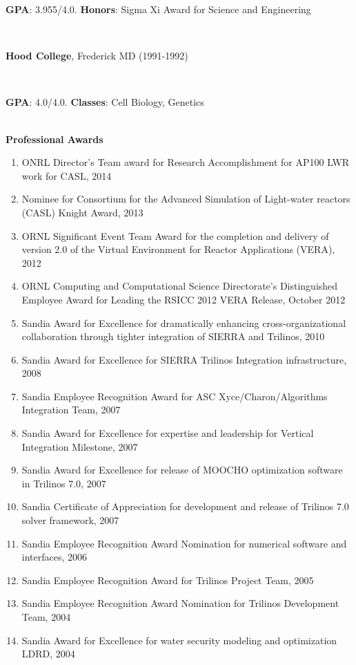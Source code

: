 \documentclass{report}
\newcommand{\secendvs}{1.5ex}
\newcommand{\indentone}{0.5in}
\newcommand{\widthone}{6.4in}
\newcommand{\pboxone}{\hspace*{\indentone}\parbox[t]{\widthone}}
\newcommand{\indenttwo}{0.75in}
\newcommand{\widthtwo}{6.15in}
\newcommand{\pboxtwo}{\hspace*{\indenttwo}\parbox[t]{\widthtwo}}
\begin{document}
%
{}\pboxtwo{\textbf{GPA}: 3.955/4.0.  {}\textbf{Honors}: Sigma Xi Award for Science and Engineering} \\[\secendvs]
%
{}\pboxone{\textbf{Hood College}, Frederick MD (1991-1992)} \\
%
{}\pboxtwo{\textbf{GPA}: 4.0/4.0. {}\textbf{Classes}: Cell Biology, Genetics} \\[\secendvs]
%
%
{}\textbf{\Large Professional Awards}
%
\begin{enumerate}
%
{}\item ONRL Director's Team award for Research Accomplishment for AP100 LWR work for CASL, 2014
%
{}\item Nominee for Consortium for the Advanced Simulation of Light-water reactors (CASL) Knight Award, 2013
%
{}\item ORNL Significant Event Team Award for the completion and delivery of version 2.0 of the Virtual Environment for Reactor Applications (VERA), 2012
%
{}\item ORNL Computing and Computational Science Directorate's Distinguished Employee Award for Leading the RSICC 2012 VERA Release, October 2012
%
{}\item Sandia Award for Excellence for dramatically enhancing cross-organizational collaboration through tighter integration of SIERRA and Trilinos, 2010
%
{}\item Sandia Award for Excellence for SIERRA Trilinos Integration infrastructure, 2008
%
{}\item Sandia Employee Recognition Award for ASC Xyce/Charon/Algorithms Integration Team, 2007
%
{}\item Sandia Award for Excellence for expertise and leadership for Vertical Integration Milestone, 2007
%
{}\item Sandia Award for Excellence for release of MOOCHO optimization software in Trilinos 7.0, 2007
%
{}\item Sandia Certificate of Appreciation for development and release of Trilinos 7.0 solver framework, 2007 
%
{}\item Sandia Employee Recognition Award Nomination for numerical software and interfaces, 2006 
%
{}\item Sandia Employee Recognition Award for Trilinos Project Team, 2005 
%
{}\item Sandia Employee Recognition Award Nomination for Trilinos Development Team, 2004 
%
{}\item Sandia Award for Excellence for water security modeling and optimization LDRD, 2004 

\end{enumerate}
\end{document}

